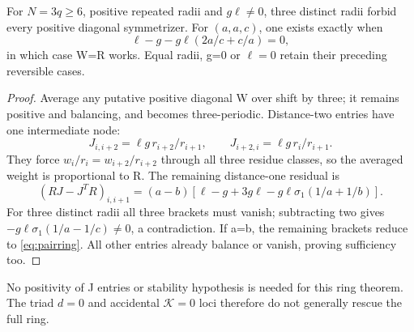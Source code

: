 \begin{theorem}\label{thm:ringdiag}
For \(N=3q\ge6\), positive repeated radii and \(g\ell\ne0\), three distinct radii forbid every positive diagonal symmetrizer. For \((a,a,c)\), one exists exactly when
\begin{equation}
\ell-g-g\ell(2a/c+c/a)=0,\label{eq:pairring}
\end{equation}
in which case W=R works. Equal radii, g=0 or \(\ell=0\) retain their preceding reversible cases.
\end{theorem}
\begin{proof}
Average any putative positive diagonal W over shift by three; it remains positive and balancing, and becomes three-periodic. Distance-two entries have one intermediate node:
\[
J_{i,i+2}=\ell g\,r_{i+2}/r_{i+1},\qquad
J_{i+2,i}=\ell g\,r_i/r_{i+1}.
\]
They force \(w_i/r_i=w_{i+2}/r_{i+2}\) through all three residue classes, so the averaged weight is proportional to R. The remaining distance-one residual is
\begin{equation}
(RJ-J^TR)_{i,i+1}
=(a-b)[\ell-g+3g\ell-g\ell\sigma_1(1/a+1/b)].\label{eq:ringres}
\end{equation}
For three distinct radii all three brackets must vanish; subtracting two gives
\(-g\ell\sigma_1(1/a-1/c)\ne0\), a contradiction. If a=b, the remaining brackets reduce to \eqref{eq:pairring}. All other entries already balance or vanish, proving sufficiency too.
\end{proof}
No positivity of J entries or stability hypothesis is needed for this ring theorem. The triad \(d=0\) and accidental \(\mathcal K=0\) loci therefore do not generally rescue the full ring. 
